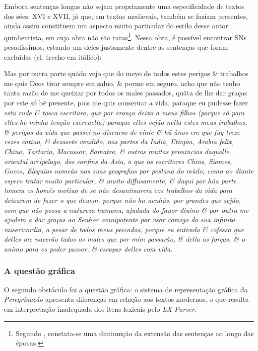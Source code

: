 \documentclass[portuguese]{textolivre}
\begin{document}
Embora sentenças longas não sejam propriamente uma especificidade de textos dos sécs. XVI e XVII, já que, em textos medievais, também se faziam presentes, ainda assim constituem um aspecto muito particular do estilo desse autor quinhentista, em cuja obra não são raras\footnote{Segundo \textcite[p.~7]{savoy_machine_2020}, constata-se uma diminuição da extensão das sentenças ao longo das épocas.}. Nessa obra, é possível encontrar SNs pesadíssimos, estando um deles justamente dentre as sentenças que foram excluídas (cf. trecho em itálico):

\begin{description}[topsep=10pt, parsep=2pt, itemindent=!]
\item[(02)\label{02}]
Mas por outra parte quãdo vejo que do meyo de todos estes perigos \& trabalhos me quis Deos tirar sempre em saluo, \& porme em seguro, acho que não tenho tanta razão de me queixar por todos os males passados, quãta de lhe dar graças por este só bẽ presente, pois me quis conseruar a vida, paraque eu pudesse fazer \textit{esta rude \& tosca escritura, que por erança deixo a meus filhos (porque só para elles he minha tenção escreuella) paraque elles vejão nella estes meus trabalhos, \& perigos da vida que passei no discurso de vinte \& hũ ãnos em que fuy treze vezes catiuo, \& dezasete vendido, nas partes da India, Etiopia, Arabia felix, China, Tartaria, Macassar, Samatra, \& outras muitas prouincias daquelle oriental arcipelago, dos confins da Asia, a que os escritores Chins, Siames, Gueos, Elequios nomeão nas suas geografias por pestana do mũdo, como ao diante espero tratar muito particular, \& muito diffusamente, \& daqui por hũa parte tomem os homẽs motiuo de se não desanimarem cos trabalhos da vida para deixarem de fazer o que deuem, porque não ha nenhũs, por grandes que sejão, com que não possa a natureza humana, ajudada do fauor diuino \& por outra me ajudem a dar graças ao Senhor omnipotente por vsar comigo da sua infinita misericordia, a pesar de todos meus peccados, porque eu entendo \& cõfesso que delles me nacerão todos os males que por mim passarão, \& della as forças, \& o animo para os poder passar, \& escapar delles com vida.}
\end{description}


\subsubsection{A questão gráfica}

O segundo obstáculo foi a questão gráfica: o sistema de representação gráfica da \textit{Peregrinação} apresenta diferenças em relação aos textos modernos, o que resulta em interpretação inadequada dos itens lexicais pelo \textit{LX-Parser}.
\end{document}

